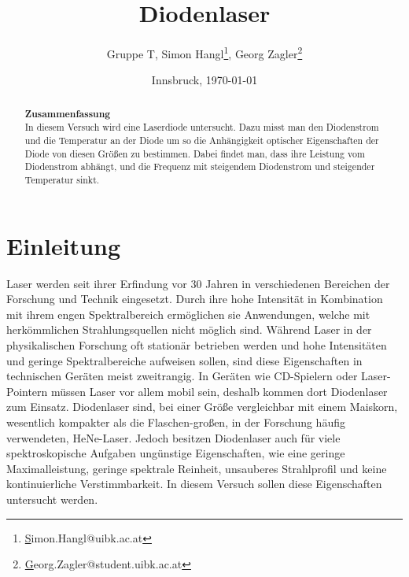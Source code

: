 \documentclass[a4paper,10pt]{scrartcl} %
\title{Diodenlaser}
\author{Gruppe T, Simon Hangl\footnote{\href{mailto:simon.hangl@uibk.ac.at}Simon.Hangl@uibk.ac.at}, Georg Zagler\footnote{\href{mailto:georg.zagler@student.uibk.ac.at}Georg.Zagler@student.uibk.ac.at}}
\date{Innsbruck, \today}
\begin{document}
\maketitle
\tableofcontents

\begin{abstract}
\textbf{Zusammenfassung}\\
In diesem Versuch wird eine Laserdiode untersucht. Dazu misst man den Diodenstrom und die Temperatur an der Diode um so die Anhängigkeit optischer Eigenschaften der Diode von diesen Grö\ss en zu bestimmen. Dabei findet man, dass ihre Leistung vom Diodenstrom abhängt, und die Frequenz mit steigendem Diodenstrom und steigender Temperatur sinkt.
\end{abstract}

\section{Einleitung}
\label{sec:Einleitung}
Laser werden seit ihrer Erfindung vor 30 Jahren in verschiedenen Bereichen der Forschung und Technik eingesetzt. Durch ihre hohe Intensität in Kombination mit ihrem engen Spektralbereich ermöglichen sie Anwendungen, welche mit herkömmlichen Strahlungsquellen nicht möglich sind. Während Laser in der physikalischen Forschung oft stationär betrieben werden und hohe Intensitäten und geringe Spektralbereiche aufweisen sollen, sind diese Eigenschaften in technischen Geräten meist zweitrangig. In Geräten wie CD-Spielern oder Laser-Pointern müssen Laser vor allem mobil sein, deshalb kommen dort Diodenlaser zum Einsatz. Diodenlaser sind, bei einer Grö\ss e vergleichbar mit einem Maiskorn, wesentlich kompakter als die Flaschen-gro\ss en, in der Forschung häufig verwendeten, HeNe-Laser. Jedoch besitzen Diodenlaser auch für viele spektroskopische Aufgaben ungünstige Eigenschaften, wie eine geringe Maximalleistung, geringe spektrale Reinheit, unsauberes Strahlprofil und keine kontinuierliche Verstimmbarkeit. In diesem Versuch sollen diese Eigenschaften untersucht werden.
\end{document}
